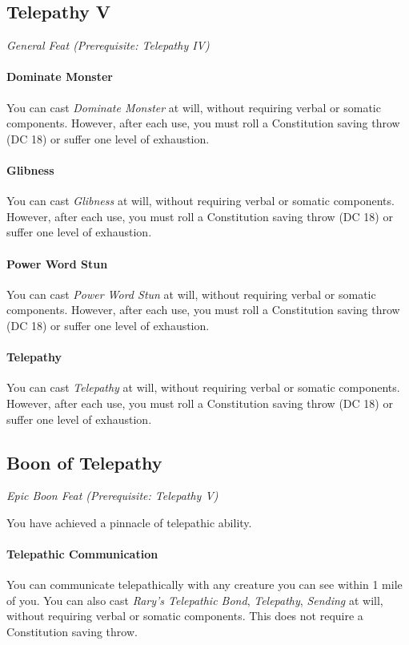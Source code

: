 \documentclass[twocolumn]{dndbook}
\begin{document}
\subsection{Telepathy V}
{\emph{General Feat (Prerequisite: Telepathy IV)}}\par
\paragraph*{Dominate Monster} You can cast \emph{Dominate Monster} at will,
without requiring verbal or somatic components. However, after each use, you must roll a Constitution saving throw (DC 18) or suffer one level of exhaustion.
\paragraph*{Glibness} You can cast \emph{Glibness} at will,
without requiring verbal or somatic components. However, after each use, you must roll a Constitution saving throw (DC 18) or suffer one level of exhaustion.
\paragraph*{Power Word Stun} You can cast \emph{Power Word Stun} at will,
without requiring verbal or somatic components. However, after each use, you must roll a Constitution saving throw (DC 18) or suffer one level of exhaustion.
\paragraph*{Telepathy} You can cast \emph{Telepathy} at will,
without requiring verbal or somatic components. However, after each use, you must roll a Constitution saving throw (DC 18) or suffer one level of exhaustion.


\subsection{Boon of Telepathy}
{\emph{Epic Boon Feat (Prerequisite: Telepathy V)}}\par
You have achieved a pinnacle of telepathic ability.
\paragraph*{Telepathic Communication}
You can communicate telepathically with any creature you can see within 1 mile of you.
You can also cast \emph{Rary's Telepathic Bond}, \emph{Telepathy}, \emph{Sending} at will,
without requiring verbal or somatic components. This does not require a Constitution saving throw.
\end{document}
